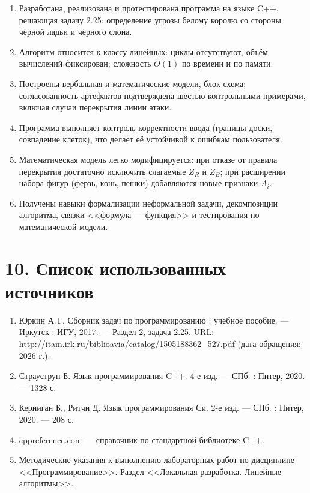 \documentclass[12pt,a4paper]{article}
\begin{document}
\begin{enumerate}
  \item Разработана, реализована и протестирована программа на языке
        C++, решающая задачу 2.25: определение угрозы белому королю
        со стороны чёрной ладьи и чёрного слона.
  \item Алгоритм относится к классу линейных: циклы отсутствуют,
        объём вычислений фиксирован; сложность $O(1)$ по времени и
        по памяти.
  \item Построены вербальная и математические модели, блок-схема;
        согласованность артефактов подтверждена шестью контрольными
        примерами, включая случаи перекрытия линии атаки.
  \item Программа выполняет контроль корректности ввода (границы
        доски, совпадение клеток), что делает её устойчивой к ошибкам
        пользователя.
  \item Математическая модель легко модифицируется: при отказе от
        правила перекрытия достаточно исключить слагаемые $Z_R$ и
        $Z_B$; при расширении набора фигур (ферзь, конь, пешки)
        добавляются новые признаки $A_i$.
  \item Получены навыки формализации неформальной задачи,
        декомпозиции алгоритма, связки <<формула --- функция>> и
        тестирования по математической модели.
\end{enumerate}

\section*{10. Список использованных источников}

\begin{enumerate}
  \item Юркин А.\,Г. Сборник задач по программированию : учебное
        пособие. --- Иркутск : ИГУ, 2017. --- Раздел 2, задача 2.25.
        URL: http://itam.irk.ru/biblioavia/catalog/1505188362_527.pdf
        (дата обращения: 2026 г.).
  \item Страуструп Б. Язык программирования C++. 4-е изд. --- СПб. :
        Питер, 2020. --- 1328 с.
  \item Керниган Б., Ритчи Д. Язык программирования Си. 2-е изд. ---
        СПб. : Питер, 2020. --- 208 с.
  \item cppreference.com --- справочник по стандартной библиотеке C++.
  \item Методические указания к выполнению лабораторных работ по
        дисциплине <<Программирование>>. Раздел <<Локальная разработка.
        Линейные алгоритмы>>.
\end{enumerate}
\end{document}
